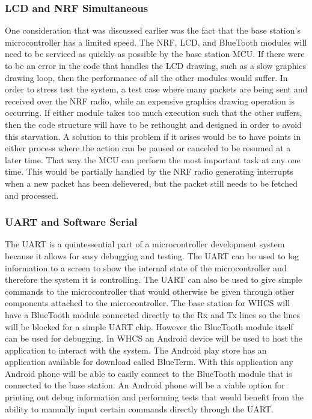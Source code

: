 \subsubsection{LCD and NRF Simultaneous}
One consideration that was discussed earlier was the fact that the base
station's microcontroller has a limited speed. The NRF, LCD, and BlueTooth
modules will need to be serviced as quickly as possible by the base station
MCU. If there were to be an error in the code that handles the LCD drawing,
such as a slow graphics drawing loop, then the performance of all the other
modules would suffer. In order to stress test the system, a test case where
many packets are being sent and received over the NRF radio, while an expensive
graphics drawing operation is occurring. If either module takes too much
execution such that the other suffers, then the code structure will have to be
rethought and designed in order to avoid this starvation. A solution to this
problem if it arises would be to have points in either process where the action
can be paused or canceled to be resumed at a later time. That way the MCU can
perform the most important task at any one time. This would be partially
handled by the NRF radio generating interrupts when a new packet has been
delievered, but the packet still needs to be fetched and processed.

\subsubsection{UART and Software Serial}
The UART is a quintessential part of a microcontroller development system
because it allows for easy debugging and testing. The UART can be used to log
information to a screen to show the internal state of the microcontroller and
therefore the system it is controlling. The UART can also be used to give
simple commands to the microcontroller that would otherwise be given through
other components attached to the microcontroller. The base station for WHCS
will have a BlueTooth module connected directly to the Rx and Tx lines so the
lines will be blocked for a simple UART chip. However the BlueTooth module
itself can be used for debugging. In WHCS an Android device will be used to
host the application to interact with the system. The Android play store has an
application available for download called BlueTerm. With this application any
Android phone will be able to easily connect to the BlueTooth module that is
connected to the base station. An Android phone will be a viable option for
printing out debug information and performing tests that would benefit from the
ability to manually input certain commands directly through the UART.

